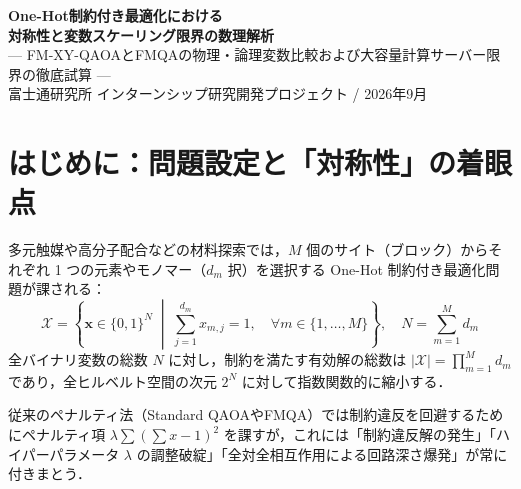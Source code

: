 \documentclass[11pt,a4paper]{ltjsarticle}
\begin{document}
\begin{center}
\vspace*{-4mm}
{\LARGE\textbf{One-Hot制約付き最適化における\\[1.5mm]対称性と変数スケーリング限界の数理解析}}\\[1.5mm]
{\large--- FM-XY-QAOAとFMQAの物理・論理変数比較および大容量計算サーバー限界の徹底試算 ---}\\[1.5mm]
{\normalsize 富士通研究所 インターンシップ研究開発プロジェクト \quad / \quad 2026年9月}
\vspace{-1mm}
\end{center}

\begin{abstract}
\noindent
ブラックボックス最適化（BBO）や材料設計などの産業実課題において，One-Hot制約（各ブロックから1選択肢を選ぶ）を伴う組み合わせ最適化は普遍的かつ重要である．本稿では，先行研究FMQA（量子アニーリング / SA）と提案手法FM-XY-QAOA（ゲート型量子部分空間探索）を対象とし，\textbf{(1) 数学的な論理変数 $N$ と実機物理量子ビット数の本質的相違}，\textbf{(2) 量子力学における粒子数保存対称性（$U(1)$ 対称性）と可換性の厳密証明}，\textbf{(3) 手元PCから128GB〜2TB大容量計算サーバー環境における変数スケーリング限界の徹底試算}，\textbf{(4) ハミルトニアンのスパース性に基づく線形時間計算量とNISQ実機への適合性}，について理論的・定量的な総括を行う．
\end{abstract}

\vspace{-1mm}

\section{はじめに：問題設定と「対称性」の着眼点}
\label{sec:intro}
多元触媒や高分子配合などの材料探索では，$M$ 個のサイト（ブロック）からそれぞれ 1 つの元素やモノマー（$d_m$ 択）を選択する One-Hot 制約付き最適化問題が課される：
\begin{equation}
\mathcal{X} = \left\{ \bm{x} \in \{0, 1\}^N \;\middle|\; \sum_{j=1}^{d_m} x_{m, j} = 1, \quad \forall m \in \{1, \dots, M\} \right\}, \quad N = \sum_{m=1}^M d_m
\end{equation}
全バイナリ変数の総数 $N$ に対し，制約を満たす有効解の総数は $|\mathcal{X}| = \prod_{m=1}^M d_m$ であり，全ヒルベルト空間の次元 $2^N$ に対して指数関数的に縮小する．

従来のペナルティ法（Standard QAOAやFMQA）では制約違反を回避するためにペナルティ項 $\lambda \sum (\sum x - 1)^2$ を課すが，これには「制約違反解の発生」「ハイパーパラメータ $\lambda$ の調整破綻」「全対全相互作用による回路深さ爆発」が常に付きまとう．
\end{document}
